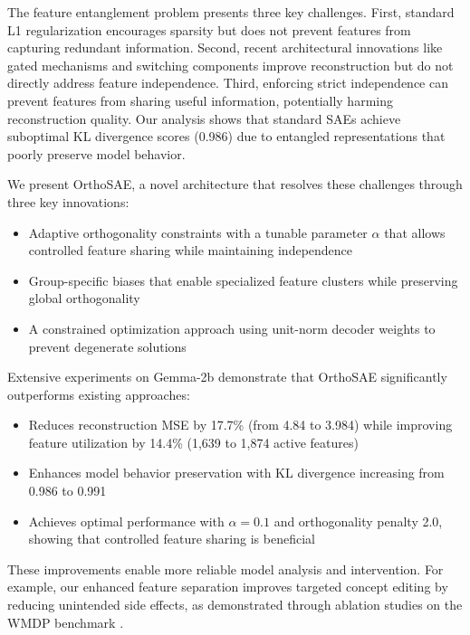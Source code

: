 \documentclass{article} %
\begin{document}
The feature entanglement problem presents three key challenges. First, standard L1 regularization encourages sparsity but does not prevent features from capturing redundant information. Second, recent architectural innovations like gated mechanisms \cite{rajamanoharanImprovingDictionaryLearning2024} and switching components \cite{mudideEfficientDictionaryLearning2024a} improve reconstruction but do not directly address feature independence. Third, enforcing strict independence can prevent features from sharing useful information, potentially harming reconstruction quality. Our analysis shows that standard SAEs achieve suboptimal KL divergence scores (0.986) due to entangled representations that poorly preserve model behavior.

We present OrthoSAE, a novel architecture that resolves these challenges through three key innovations:

\begin{itemize}
    \item Adaptive orthogonality constraints with a tunable parameter $\alpha$ that allows controlled feature sharing while maintaining independence
    \item Group-specific biases that enable specialized feature clusters while preserving global orthogonality
    \item A constrained optimization approach using unit-norm decoder weights to prevent degenerate solutions
\end{itemize}

Extensive experiments on Gemma-2b demonstrate that OrthoSAE significantly outperforms existing approaches:

\begin{itemize}
    \item Reduces reconstruction MSE by 17.7\% (from 4.84 to 3.984) while improving feature utilization by 14.4\% (1,639 to 1,874 active features)
    \item Enhances model behavior preservation with KL divergence increasing from 0.986 to 0.991
    \item Achieves optimal performance with $\alpha=0.1$ and orthogonality penalty 2.0, showing that controlled feature sharing is beneficial
\end{itemize}

These improvements enable more reliable model analysis and intervention. For example, our enhanced feature separation improves targeted concept editing by reducing unintended side effects, as demonstrated through ablation studies on the WMDP benchmark \cite{Li2024TheWB}.
\end{document}
